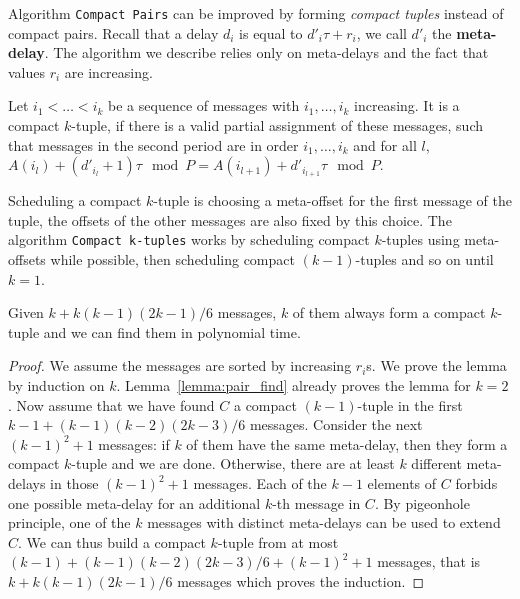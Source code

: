 \documentclass[a4paper,UKenglish,cleveref, autoref, thm-restate]{lipics-v2019}
\newcommand\compactpair{\texttt{Compact Pairs}\xspace}
\begin{document}
Algorithm \compactpair can be improved by forming \emph{compact tuples} instead of compact pairs. Recall that a delay $d_i$ is equal to  $d'_i\tau + r_i$, we call $d'_i$ the \textbf{meta-delay}. The algorithm we describe relies only on meta-delays and the fact that values $r_i$ are increasing.

\begin{definition}
Let $i_1 < \dots < i_k$ be a sequence of messages with $i_1,\dots,i_k$ increasing. 
It is a compact $k$-tuple, if there is a valid partial assignment of these messages, such that messages in the second period are in order $i_1,\dots,i_k$ and for all $l$, $A(i_l) + (d'_{i_l} + 1)\tau \mod P = A(i_{l+1}) + d'_{i_{l+1}}\tau \mod P$.
\end{definition}

 Scheduling a compact $k$-tuple is choosing a meta-offset for the first message of the tuple, the offsets of the other messages are also fixed by this choice.  
The algorithm \texttt{Compact k-tuples} works by scheduling compact $k$-tuples using meta-offsets while possible, then scheduling compact $(k-1)$-tuples and so on until $k=1$.


\begin{lemma}\label{lemma:uple_find}
Given $k + k(k-1)(2k-1)/6$ messages, $k$ of them always form a compact $k$-tuple and we can find them in polynomial time. 
\end{lemma}
\begin{proof}
We assume the messages are sorted by increasing $r_i$s. We prove the lemma by induction on $k$. Lemma~\ref{lemma:pair_find} already proves the lemma for $k=2$.
Now assume that we have found $C$ a compact $(k-1)$-tuple in the first $k-1 + (k-1)(k-2)(2k-3)/6$ messages. Consider the next $(k-1)^2 + 1$ messages: if $k$ of them have the same meta-delay, then they form a compact $k$-tuple and we are done. Otherwise, there are at least $k$ different meta-delays in those $(k-1)^2 + 1$ messages. Each of the $k-1$ elements of $C$ forbids one possible meta-delay for an additional $k$-th message in $C$. By pigeonhole principle, one of the $k$ messages with distinct meta-delays can be used to extend $C$. We can thus build a compact $k$-tuple from at most $(k-1) + (k-1)(k-2)(2k-3)/6 + (k-1)^2 + 1$ messages, that is $k + k(k-1)(2k-1)/6$ messages which proves the induction.
\end{proof}
\end{document}
